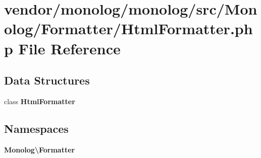 \section{vendor/monolog/monolog/src/\+Monolog/\+Formatter/\+Html\+Formatter.php File Reference}
\label{monolog_2monolog_2src_2_monolog_2_formatter_2_html_formatter_8php}
\subsection*{Data Structures}
\begin{DoxyCompactItemize}
\item 
class {\bf Html\+Formatter}
\end{DoxyCompactItemize}
\subsection*{Namespaces}
\begin{DoxyCompactItemize}
\item 
 {\bf Monolog\textbackslash{}\+Formatter}
\end{DoxyCompactItemize}

